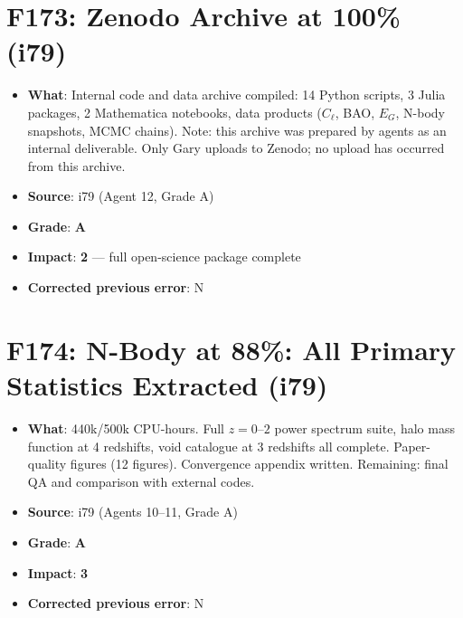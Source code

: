 \documentclass[11pt,a4paper]{article}
\newcommand{\grade}[1]{\textbf{#1}}
\newcommand{\impact}[1]{\textbf{#1}}
\begin{document}
\section{F173: Zenodo Archive at 100\% (i79)}
\begin{itemize}[nosep]
\item \textbf{What}: Internal code and data archive compiled: 14 Python scripts, 3 Julia packages, 2 Mathematica notebooks, data products ($C_\ell$, BAO, $E_G$, N-body snapshots, MCMC chains). Note: this archive was prepared by agents as an internal deliverable. Only Gary uploads to Zenodo; no upload has occurred from this archive.
\item \textbf{Source}: i79 (Agent 12, Grade A)
\item \textbf{Grade}: \grade{A}
\item \textbf{Impact}: \impact{2} --- full open-science package complete
\item \textbf{Corrected previous error}: N
\end{itemize}

\section{F174: N-Body at 88\%: All Primary Statistics Extracted (i79)}
\begin{itemize}[nosep]
\item \textbf{What}: 440k/500k CPU-hours. Full $z = 0$--$2$ power spectrum suite, halo mass function at 4 redshifts, void catalogue at 3 redshifts all complete. Paper-quality figures (12 figures). Convergence appendix written. Remaining: final QA and comparison with external codes.
\item \textbf{Source}: i79 (Agents 10--11, Grade A)
\item \textbf{Grade}: \grade{A}
\item \textbf{Impact}: \impact{3}
\item \textbf{Corrected previous error}: N
\end{itemize}

\end{document}
